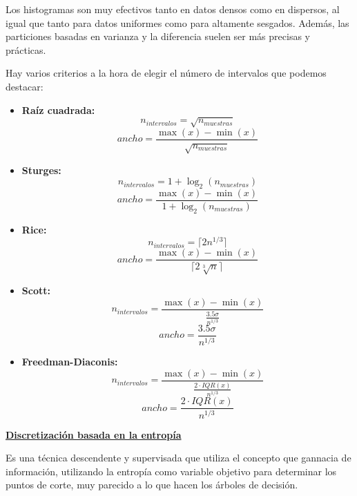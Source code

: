 \documentclass[12pt, letterpaper]{article}
\begin{document}
Los histogramas son muy efectivos tanto en datos densos como en dispersos, al igual que tanto para datos uniformes como para altamente sesgados. Además, las particiones basadas en varianza y la diferencia suelen ser más precisas y prácticas.

Hay varios criterios a la hora de elegir el número de intervalos que podemos destacar:
\begin{itemize}
    \item \textbf{Raíz cuadrada:}
    \[
        n_{intervalos} = \sqrt{n_{muestras}}
    \]
    \[
        ancho = \frac{\max(x) - \min(x)}{\sqrt{n_{muestras}}}
    \]

    \item \textbf{Sturges:}
    \[
        n_{intervalos} = 1 + \log_2(n_{muestras})
    \]
    \[
        ancho = \frac{\max(x) - \min(x)}{1 + \log_2(n_{muestras})}
    \]

    \item \textbf{Rice:}
    \[
        n_{intervalos} = \lceil 2n^{1/3} \rceil   \]
    \[
        ancho = \frac{\max(x) - \min(x)}{\lceil 2\sqrt[3]{n} \rceil}
    \]

    \item \textbf{Scott:}
    \[
        n_{intervalos} = \frac{\max(x) - \min(x)}{\frac{3.5\sigma}{n^{1/3}}}
    \]
    \[
        ancho = \frac{3.5\sigma}{n^{1/3}}
    \]

    \item \textbf{Freedman-Diaconis:}
    \[
        n_{intervalos} = \frac{\max(x) - \min(x)}{\frac{2 \cdot IQR(x)}{n^{1/3}}}
    \]
    \[
        ancho = \frac{2 \cdot IQR(x)}{n^{1/3}}
    \]
\end{itemize}

\vspace{1 em}
\underline{\textbf{Discretización basada en la entropía}}

Es una técnica descendente y supervisada que utiliza el concepto que gannacia de información, utilizando la entropía como variable objetivo para determinar los puntos de corte, muy parecido a lo que hacen los árboles de decisión.
\end{document}
